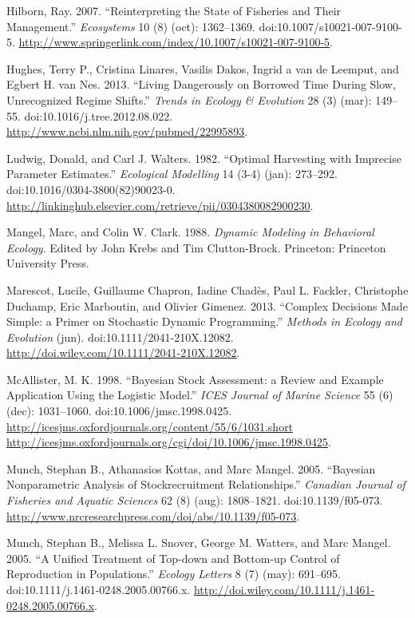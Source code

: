 \documentclass[author-year, review]{elsarticle} %
\begin{document}
Hilborn, Ray. 2007. ``Reinterpreting the State of Fisheries and Their
Management.'' \emph{Ecosystems} 10 (8) (oct): 1362--1369.
doi:10.1007/s10021-007-9100-5.
\url{http://www.springerlink.com/index/10.1007/s10021-007-9100-5}.

Hughes, Terry P., Cristina Linares, Vasilis Dakos, Ingrid a van de
Leemput, and Egbert H. van Nes. 2013. ``Living Dangerously on Borrowed
Time During Slow, Unrecognized Regime Shifts.'' \emph{Trends in Ecology
\& Evolution} 28 (3) (mar): 149--55. doi:10.1016/j.tree.2012.08.022.
\url{http://www.ncbi.nlm.nih.gov/pubmed/22995893}.

Ludwig, Donald, and Carl J. Walters. 1982. ``Optimal Harvesting with
Imprecise Parameter Estimates.'' \emph{Ecological Modelling} 14 (3-4)
(jan): 273--292. doi:10.1016/0304-3800(82)90023-0.
\url{http://linkinghub.elsevier.com/retrieve/pii/0304380082900230}.

Mangel, Marc, and Colin W. Clark. 1988. \emph{Dynamic Modeling in
Behavioral Ecology}. Edited by John Krebs and Tim Clutton-Brock.
Princeton: Princeton University Press.

Marescot, Lucile, Guillaume Chapron, Iadine Chadès, Paul L. Fackler,
Christophe Duchamp, Eric Marboutin, and Olivier Gimenez. 2013. ``Complex
Decisions Made Simple: a Primer on Stochastic Dynamic Programming.''
\emph{Methods in Ecology and Evolution} (jun).
doi:10.1111/2041-210X.12082.
\url{http://doi.wiley.com/10.1111/2041-210X.12082}.

McAllister, M. K. 1998. ``Bayesian Stock Assessment: a Review and
Example Application Using the Logistic Model.'' \emph{ICES Journal of
Marine Science} 55 (6) (dec): 1031--1060. doi:10.1006/jmsc.1998.0425.
\href{http://icesjms.oxfordjournals.org/content/55/6/1031.short http://icesjms.oxfordjournals.org/cgi/doi/10.1006/jmsc.1998.0425}{http://icesjms.oxfordjournals.org/content/55/6/1031.short
http://icesjms.oxfordjournals.org/cgi/doi/10.1006/jmsc.1998.0425}.

Munch, Stephan B., Athanasios Kottas, and Marc Mangel. 2005. ``Bayesian
Nonparametric Analysis of Stockrecruitment Relationships.''
\emph{Canadian Journal of Fisheries and Aquatic Sciences} 62 (8) (aug):
1808--1821. doi:10.1139/f05-073.
\url{http://www.nrcresearchpress.com/doi/abs/10.1139/f05-073}.

Munch, Stephan B., Melissa L. Snover, George M. Watters, and Marc
Mangel. 2005. ``A Unified Treatment of Top-down and Bottom-up Control of
Reproduction in Populations.'' \emph{Ecology Letters} 8 (7) (may):
691--695. doi:10.1111/j.1461-0248.2005.00766.x.
\url{http://doi.wiley.com/10.1111/j.1461-0248.2005.00766.x}.
\end{document}
